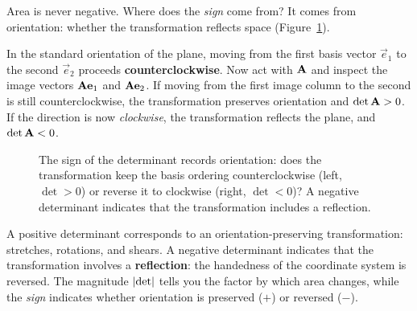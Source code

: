 Area is never negative. Where does the
\emph{sign} come from? It comes from orientation: whether the
transformation reflects space (Figure~\ref{ch21:fig-orientation}).

In the standard orientation of the plane, moving from the first basis vector
$\vec e_1$ to the second $\vec e_2$ proceeds \textbf{counterclockwise}. Now act
with $\mathbf{A}$ and inspect the image vectors $\mathbf{A}\mathbf{e}_1$ and $\mathbf{A}\mathbf{e}_2$. If moving from the first image column to the second is still
counterclockwise, the transformation preserves orientation and $\det\mathbf{A} > 0$.
If the direction is now \emph{clockwise}, the transformation reflects the plane,
and $\det\mathbf{A} < 0$.

\begin{figure}[H]
\centering
{}
\caption{The sign of the determinant records orientation: does the transformation
keep the basis ordering counterclockwise (left, $\det>0$) or reverse it to
clockwise (right, $\det<0$)? A negative determinant indicates that the
transformation includes a reflection.}
\label{ch21:fig-orientation}
\end{figure}

\begin{intuitionbox}
A positive determinant corresponds to an orientation-preserving transformation:
stretches, rotations, and shears. A negative determinant indicates that the
transformation involves a \textbf{reflection}: the handedness of the coordinate
system is reversed. The magnitude $\lvert\det\rvert$ tells you the factor by which
area changes, while the \emph{sign} indicates whether orientation is preserved
($+$) or reversed ($-$).
\end{intuitionbox}

